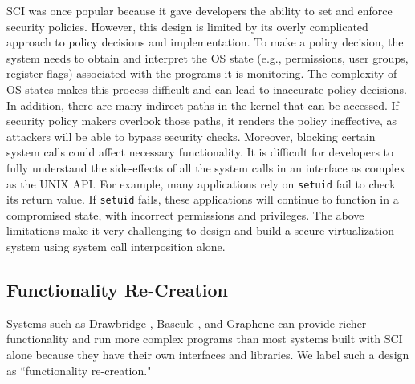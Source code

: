 SCI was once popular
because it gave developers the ability to set and enforce security policies.
However, this design is limited by its overly complicated approach to policy
decisions and implementation.
To make a policy decision, the system needs to
obtain and interpret the OS state (e.g., permissions, user groups, register flags)
associated with the programs it is monitoring.
The complexity of OS states makes this process difficult and can lead to
inaccurate policy decisions.
In addition, there are many indirect paths in the kernel that can be accessed.
If security policy makers overlook those paths, it renders the
policy ineffective, as attackers will be able to
bypass security checks.
Moreover, blocking
certain system calls could affect necessary functionality.
It is difficult for developers to fully understand the side-effects of all the
system calls in an interface as complex as the UNIX API.
For example, many applications rely on \texttt{setuid} fail to check its return value.
If \texttt{setuid} fails, these applications will continue to function in a compromised state,
with incorrect permissions and privileges.
The above limitations make it very challenging to design and build a secure virtualization system using
system call interposition alone.

\subsection{Functionality Re-Creation}
Systems such as  Drawbridge \cite{Drawbridge-11},
 Bascule \cite{Bascule}, and Graphene \cite{Graphene-14} can
provide richer functionality and run more complex programs than most systems built
with SCI alone because they have their own
interfaces and libraries. We label such a design
as ``functionality re-creation."

